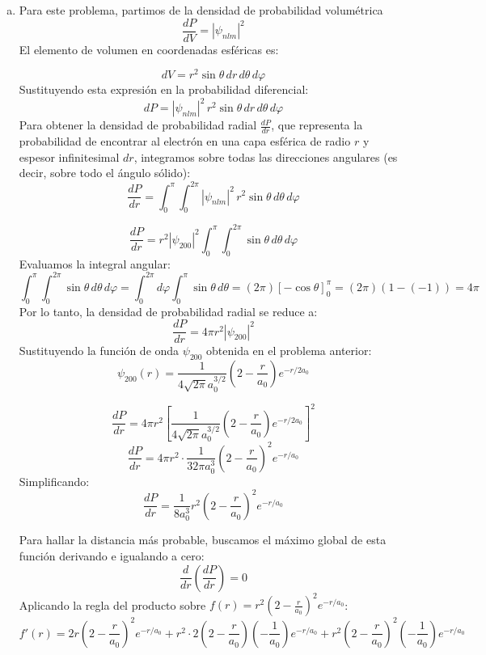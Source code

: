 \documentclass[a4paper]{article}
\begin{document}
\begin{enumerate}[a)]
$$ \frac{1}{2\sqrt{2} a_0^{3/2}} \cdot \frac{1}{2\sqrt{\pi}} = \frac{1}{4\sqrt{2\pi} a_0^{3/2}} $$
Por lo tanto, la función de onda explícita y simplificada es:
$$ \psi_{200}(r, \theta, \varphi) = \frac{1}{4\sqrt{2\pi} a_0^{3/2}} \left( 2 - \frac{r}{a_0} \right) e^{-r/2a_0} $$

Esta expresión representa el estado excitado de menor energía (nivel $n=2$, subnivel $s$) del átomo de hidrógeno.
	

\item Para este problema, partimos de la densidad de probabilidad volumétrica
$$ \frac{dP}{dV} = |\psi_{nlm}|^2 $$
El elemento de volumen en coordenadas esféricas es:

$$ dV = r^2 \sin\theta \, dr \, d\theta \, d\varphi $$
Sustituyendo esta expresión en la probabilidad diferencial:
$$ dP = |\psi_{nlm}|^2 \, r^2 \sin\theta \, dr \, d\theta \, d\varphi $$
Para obtener la densidad de probabilidad radial $\frac{dP}{dr}$, que representa la probabilidad de encontrar al electrón en una capa esférica de radio $r$ y espesor infinitesimal $dr$, integramos sobre todas las direcciones angulares (es decir, sobre todo el ángulo sólido):
$$ \frac{dP}{dr} = \int_{0}^{\pi}\int_{0}^{2\pi} |\psi_{nlm}|^2 \, r^2 \sin\theta \, d\theta \, d\varphi $$

$$ \frac{dP}{dr} = r^2 |\psi_{200}|^2 \int_{0}^{\pi}\int_{0}^{2\pi} \sin\theta \, d\theta \, d\varphi $$
Evaluamos la integral angular:
$$ \int_{0}^{\pi}\int_{0}^{2\pi} \sin\theta \, d\theta \, d\varphi = \int_{0}^{2\pi} d\varphi \int_{0}^{\pi} \sin\theta \, d\theta = (2\pi)\left[-\cos\theta\right]_0^\pi = (2\pi)(1 - (-1)) = 4\pi $$
Por lo tanto, la densidad de probabilidad radial se reduce a:
$$ \frac{dP}{dr} = 4\pi r^2 |\psi_{200}|^2 $$
Sustituyendo la función de onda $\psi_{200}$ obtenida en el problema anterior:
$$ \psi_{200}(r) = \frac{1}{4\sqrt{2\pi} a_0^{3/2}} \left( 2 - \frac{r}{a_0} \right) e^{-r/2a_0} $$

$$ \frac{dP}{dr} = 4\pi r^2 \left[ \frac{1}{4\sqrt{2\pi} a_0^{3/2}} \left( 2 - \frac{r}{a_0} \right) e^{-r/2a_0} \right]^2 $$
$$ \frac{dP}{dr} = 4\pi r^2 \cdot \frac{1}{32\pi a_0^3} \left( 2 - \frac{r}{a_0} \right)^2 e^{-r/a_0} $$
Simplificando:
$$ \frac{dP}{dr} = \frac{1}{8a_0^3} r^2 \left( 2 - \frac{r}{a_0} \right)^2 e^{-r/a_0} $$

Para hallar la distancia más probable, buscamos el máximo global de esta función derivando e igualando a cero:
$$ \frac{d}{dr}\left(\frac{dP}{dr}\right) = 0 $$
Aplicando la regla del producto sobre $f(r) = r^2 \left( 2 - \frac{r}{a_0} \right)^2 e^{-r/a_0}$:
$$ f'(r) = 2r\left(2-\frac{r}{a_0}\right)^2 e^{-r/a_0} + r^2 \cdot 2\left(2-\frac{r}{a_0}\right)\left(-\frac{1}{a_0}\right)e^{-r/a_0} + r^2\left(2-\frac{r}{a_0}\right)^2\left(-\frac{1}{a_0}\right)e^{-r/a_0} $$


\end{enumerate}
\end{document}
